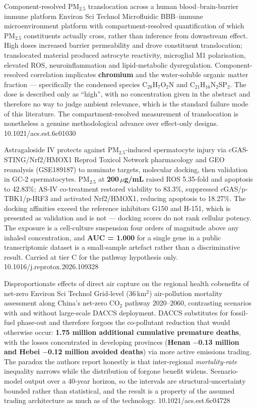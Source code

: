 \documentclass[10pt]{article}
\begin{document}
{Component-resolved PM$_{2.5}$ translocation across a human blood--brain-barrier immune platform}
{Environ Sci Technol}
{Microfluidic BBB--immune microenvironment platform with compartment-resolved
quantification of which PM$_{2.5}$ constituents actually cross, rather than inference from
downstream effect. High doses increased barrier permeability and drove constituent
translocation; translocated material produced astrocyte reactivity, microglial M1
polarisation, elevated ROS, neuroinflammation and lipid-metabolic dysregulation.
Component-resolved correlation implicates \textbf{chromium} and the water-soluble organic
matter fraction --- specifically the condensed species C$_{28}$H$_7$O$_2$N and
C$_{21}$H$_{16}$N$_2$SP$_2$. The dose is described only as ``high'', with no
concentration given in the abstract and therefore no way to judge ambient relevance, which
is the standard failure mode of this literature. The compartment-resolved measurement of
translocation is nonetheless a genuine methodological advance over effect-only designs.}
{10.1021/acs.est.6c01030}

{Astragaloside IV protects against PM$_{2.5}$-induced spermatocyte injury via cGAS-STING/Nrf2/HMOX1}
{Reprod Toxicol}
{Network pharmacology and GEO reanalysis (GSE189187) to nominate targets, molecular
docking, then validation in GC-2 spermatocytes. PM$_{2.5}$ at
\textbf{200\,$\mu$g/mL} raised ROS 5.35-fold and apoptosis to 42.83\%; AS-IV co-treatment
restored viability to 83.3\%, suppressed cGAS/p-TBK1/p-IRF3 and activated Nrf2/HMOX1,
reducing apoptosis to 18.27\%. The docking affinities exceed the reference inhibitors
G150 and H-151, which is presented as validation and is not --- docking scores do not
rank cellular potency. The exposure is a cell-culture suspension four orders of magnitude
above any inhaled concentration, and \textbf{AUC = 1.000} for a single gene in a public
transcriptomic dataset is a small-sample artefact rather than a discriminative result.
Carried at tier C for the pathway hypothesis only.}
{10.1016/j.reprotox.2026.109328}


{Disproportionate effects of direct air capture on the regional health cobenefits of net-zero}
{Environ Sci Technol}
{Grid-level (36\,km$^2$) air-pollution mortality assessment along China's net-zero CO$_2$
pathway 2020--2060, contrasting scenarios with and without large-scale DACCS deployment.
DACCS substitutes for fossil-fuel phase-out and therefore forgoes the co-pollutant
reduction that would otherwise occur: \textbf{1.75 million additional cumulative premature
deaths}, with the losses concentrated in developing provinces
(\textbf{Henan $-$0.13 million and Hebei $-$0.12 million avoided deaths}) via more active
emissions trading. The paradox the authors report honestly is that inter-regional
\emph{mortality-rate} inequality narrows while the distribution of forgone benefit widens.
Scenario-model output over a 40-year horizon, so the intervals are structural-uncertainty
bounded rather than statistical, and the result is a property of the assumed trading
architecture as much as of the technology.}
{10.1021/acs.est.6c04728}
\end{document}

